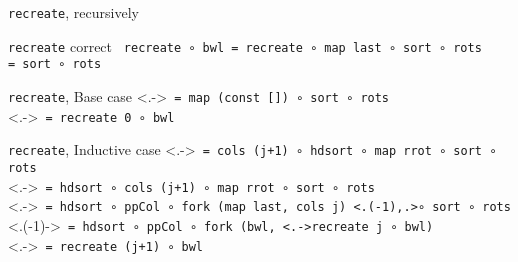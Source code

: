 \documentclass{beamer}
\begin{document}
  \begin{frame}[fragile]{\texttt{recreate}, recursively}
    \begin{block}{\texttt{recreate} correct}
      \texttt{%
        recreate \only<2->{j }∘ bwl
        = recreate ∘ map last ∘ sort ∘ rots\\
        = sort ∘ rots
      }%
    \end{block}
  \end{frame}

  \begin{frame}[fragile]{\texttt{recreate}, Base case}
    \uncover<.->{\texttt{%
      = map (const []) ∘ sort ∘ rots \\
    }}
    \uncover<.->{\texttt{%
      = recreate 0 ∘ bwl
    }}
  \end{frame}

  \begin{frame}[fragile]{\texttt{recreate}, Inductive case}
    \uncover<.->{\texttt{%
        = \alert<+>{cols (j+1) ∘ hdsort} ∘ map rrot ∘ sort ∘ rots \\
    }}
    \uncover<.->{\texttt{%
        = hdsort ∘ \alert<+>{cols (j+1) ∘ map rrot} ∘ sort ∘ rots \\
    }}
    \uncover<.->{\texttt{%
        = hdsort ∘ ppCol ∘ fork (\alert<+>{map last}, \alert<+>{cols j})
        \alert<.(-1),.>{∘ sort ∘ rots} \\
    }}
    \uncover<.(-1)->{\texttt{%
        = hdsort ∘ ppCol ∘ fork (bwl, \uncover<.->{recreate j ∘ bwl}) \\
    }}
    \uncover<.->{\texttt{%
        = recreate (j+1) ∘ bwl
    }}
  \end{frame}
\end{document}
